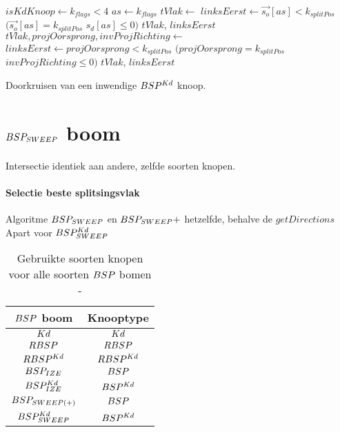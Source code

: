 \begin{dutchalgorithm}
    \begin{algorithmic}       
            \State $isKdKnoop \gets k_{flags} < 4$
                \State $as \gets k_{flags}$
                \State $tVlak \gets $ 
                \State $linksEerst \gets \vec{s_o}[as] < k_{splitPos}$ \Or $(\vec{s_o}[as] = k_{splitPos}$ \And $s_d[as] \leq 0)$
                \State \Return $tVlak$, $linksEerst$
            \Else
                \State $tVlak, projOorsprong, invProjRichting \gets $ 
                 \State $linksEerst \gets projOorsprong < k_{splitPos}$ \Or $(projOorsprong = k_{splitPos}$ \And $invProjRichting \leq 0)$
                \State \Return $tVlak$, $linksEerst$
            \EndIf
        \EndFunction
    \end{algorithmic}
    \caption{Doorkruisen van een inwendige $BSP^{Kd}$ knoop.}
\end{dutchalgorithm}

\section{$BSP_{SWEEP}$ boom}
\label{sec:h4-bspsweep}
Intersectie identiek aan andere, zelfde soorten knopen.

\paragraph{Selectie beste splitsingsvlak}
Algoritme $BSP_{SWEEP}$ en $BSP_{SWEEP} +$ hetzelfde, behalve de $getDirections$
Apart voor $BSP^{Kd}_{SWEEP}$


\begin{table}
    \centering
    \begin{tabular}{@{}|c|c|@{}} \toprule      
    $\symBSP$ boom & Knooptype \\ \midrule
    $Kd$ & $Kd$ \\
    $RBSP$ & $RBSP$  \\
    $RBSP^{Kd}$ & $RBSP^{Kd}$  \\
    $BSP_{IZE}$ &  $\symBSP$ \\
    $BSP^{Kd}_{IZE}$ & $BSP^{Kd}$ \\
    $BSP_{SWEEP(+)}$ & $\symBSP$ \\
    $BSP^{Kd}_{SWEEP}$ & $BSP^{Kd}$ \\ \bottomrule
    \end{tabular}
    \caption[Gebruikte soorten knopen voor alle soorten $\symBSP$ bomen]{Gebruikte soorten knopen voor alle soorten $\symBSP$ bomen - \small}
    \label{tab:voorstelling-knoop-boom}
\end{table}

